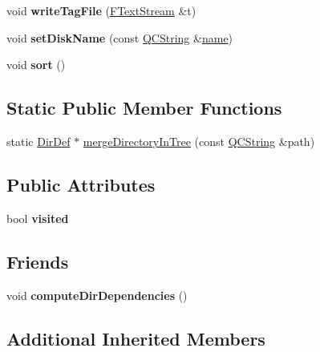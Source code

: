 \begin{DoxyCompactItemize}
\item 
\mbox{\label{class_dir_def_ad8d1b300a4725b99ccded183e05a87f0}} 
void {\bfseries write\+Tag\+File} (\mbox{\hyperlink{class_f_text_stream}{F\+Text\+Stream}} \&t)
\item 
\mbox{\label{class_dir_def_ac7523093d0169e18520b8893aa664f34}} 
void {\bfseries set\+Disk\+Name} (const \mbox{\hyperlink{class_q_c_string}{Q\+C\+String}} \&\mbox{\hyperlink{class_definition_a9324000f785d7b6b098878a3bca4df5b}{name}})
\item 
\mbox{\label{class_dir_def_a43db7d090a0006f15c0721cb60ee22b2}} 
void {\bfseries sort} ()
\end{DoxyCompactItemize}
\subsection*{Static Public Member Functions}
\begin{DoxyCompactItemize}
\item 
static \mbox{\hyperlink{class_dir_def}{Dir\+Def}} $\ast$ \mbox{\hyperlink{class_dir_def_ab3b1d03c75471701969e581aa4a6960f}{merge\+Directory\+In\+Tree}} (const \mbox{\hyperlink{class_q_c_string}{Q\+C\+String}} \&path)
\end{DoxyCompactItemize}
\subsection*{Public Attributes}
\begin{DoxyCompactItemize}
\item 
\mbox{\label{class_dir_def_ad670e7303ad663e73665b9494f0fba4a}} 
bool {\bfseries visited}
\end{DoxyCompactItemize}
\subsection*{Friends}
\begin{DoxyCompactItemize}
\item 
\mbox{\label{class_dir_def_abf61ee43dee8d980a631843cd26b71cb}} 
void {\bfseries compute\+Dir\+Dependencies} ()
\end{DoxyCompactItemize}
\subsection*{Additional Inherited Members}



